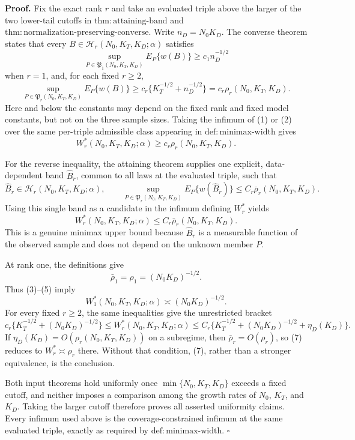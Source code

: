 \textbf{Proof.}
Fix the exact rank \(r\) and take an evaluated triple above the larger of the
two lower-tail cutoffs in
\(\mathrm{thm:attaining\mbox{-}band}\) and
\(\mathrm{thm:normalization\mbox{-}preserving\mbox{-}converse}\).  Write
\(n_D=N_0K_D\).  The converse theorem states that every
\(B\in\mathcal H_r(N_0,K_T,K_D;\alpha)\) satisfies
\[
 \sup_{P\in\mathfrak P_1(N_0,K_T,K_D)}E_P\{w(B)\}
 \ge c_1n_D^{-1/2}                                          \tag{1}
\]
when \(r=1\), and, for each fixed \(r\ge2\),
\[
 \sup_{P\in\mathfrak P_r(N_0,K_T,K_D)}E_P\{w(B)\}
 \ge c_r\{K_T^{-1/2}+n_D^{-1/2}\}
 =c_r\rho_r(N_0,K_T,K_D).                                  \tag{2}
\]
Here and below the constants may depend on the fixed rank and fixed model
constants, but not on the three sample sizes.  Taking the infimum of (1) or
(2) over the same per-triple admissible class appearing in
\(\mathrm{def:minimax\mbox{-}width}\) gives
\[
 W_r^*(N_0,K_T,K_D;\alpha)
 \ge c_r\rho_r(N_0,K_T,K_D).                               \tag{3}
\]

For the reverse inequality, the attaining theorem supplies one explicit,
data-dependent band \(\widehat B_r\), common to all laws at the evaluated
triple, such that
\[
 \widehat B_r\in\mathcal H_r(N_0,K_T,K_D;\alpha),
 \qquad
 \sup_{P\in\mathfrak P_r(N_0,K_T,K_D)}
 E_P\{w(\widehat B_r)\}
 \le C_r\bar\rho_r(N_0,K_T,K_D).                           \tag{4}
\]
Using this single band as a candidate in the infimum defining \(W_r^*\)
yields
\[
 W_r^*(N_0,K_T,K_D;\alpha)
 \le C_r\bar\rho_r(N_0,K_T,K_D).                           \tag{5}
\]
This is a genuine minimax upper bound because \(\widehat B_r\) is a
measurable function of the observed sample and does not depend on the
unknown member \(P\).

At rank one, the definitions give
\[
 \bar\rho_1=\rho_1=(N_0K_D)^{-1/2}.
\]
Thus (3)--(5) imply
\[
 W_1^*(N_0,K_T,K_D;\alpha)
 \asymp(N_0K_D)^{-1/2}.                                    \tag{6}
\]
For every fixed \(r\ge2\), the same inequalities give the unrestricted
bracket
\[
 c_r\{K_T^{-1/2}+(N_0K_D)^{-1/2}\}
 \le W_r^*(N_0,K_T,K_D;\alpha)
 \le C_r\{K_T^{-1/2}+(N_0K_D)^{-1/2}+\eta_D(K_D)\}.         \tag{7}
\]
If \(\eta_D(K_D)=O(\rho_r(N_0,K_T,K_D))\) on a subregime, then
\(\bar\rho_r=O(\rho_r)\), so (7) reduces to
\(W_r^*\asymp\rho_r\) there.  Without that condition, (7), rather than a
stronger equivalence, is the conclusion.

Both input theorems hold uniformly once
\(\min\{N_0,K_T,K_D\}\) exceeds a fixed cutoff, and neither imposes a
comparison among the growth rates of \(N_0\), \(K_T\), and \(K_D\).
Taking the larger cutoff therefore proves all asserted uniformity claims.
Every infimum used above is the coverage-constrained infimum at the same
evaluated triple, exactly as required by
\(\mathrm{def:minimax\mbox{-}width}\). \(\square\)